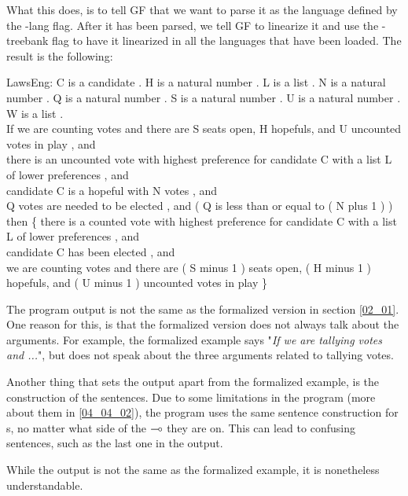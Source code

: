 What this does, is to tell GF that we want to parse it as the language defined by the -lang flag. After it has been parsed, we tell GF to linearize it  and use the -treebank flag to have it linearized in all the languages that have been loaded. The result is the following:

\begin{texto2}
LawsEng: C is a candidate . H is a natural number . L is a list . N is a natural number . Q is a natural number . S is a natural number . U is a natural number . W is a list .
\\ If we are counting votes and there are S seats open, H hopefuls, and U uncounted votes in play , and 
\\ there is an uncounted vote with highest preference for candidate C with a list L of lower preferences , and 
\\ candidate C is a hopeful with N votes , and 
\\ Q votes are needed to be elected , and ( Q is less than or equal to ( N plus 1 ) ) \\
then \{ there is a counted vote with highest preference for candidate C with a list L of lower preferences , and 
\\ candidate C has been elected , and 
\\ we are counting votes and there are ( S minus 1 ) seats open, ( H minus 1 ) hopefuls, and ( U minus 1 ) uncounted votes in play \}
\end{texto2}

The program output is not the same as the formalized version in section \ref{02_01}. One reason for this, is that the formalized version does not always talk about the arguments. For example, the formalized example says "\textit{If we are tallying votes and ...}", but does not speak about the three arguments related to tallying votes.

Another thing that sets the output apart from the formalized example, is the construction of the sentences. Due to some limitations in the program (more about them in \ref{04_04_02}), the program uses the same sentence construction for s, no matter what side of the $\multimap$ they are on. This can lead to confusing sentences, such as the last one in the output.

While the output is not the same as the formalized example, it is nonetheless understandable. 